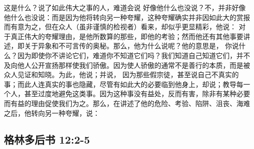 \par

这是什么？说了如此伟大之事的人，难道会说 好像他什么也没说？不，并非好像他什么也没说：而是因为他将转向另一种夸耀，这种夸耀确实并非因如此大的赏报而有意为之，但在众人（虽非谨慎的检视者）看来，却似乎更显精彩，他说： 对于真正伟大的夸耀理由，是他所数算的那些，即他的考验；然而他还有其他事要讲述，即关于异象和不可言传的奥秘。那么，他为什么说呢？他的意思是， 你说什么？因为即使你不讲论它们，难道你不知道它们吗？我们知道自己知道它们，并不及向他人公开宣扬那样使我们骄傲。因为使人骄傲的通常不是善行的本质，而是被众人见证和知晓。为此，他说；并说， 因为那些假宗徒，甚至说自己不真实的事；而此人连真实的事也隐藏，尽管有如此大的必要临到他身上，却说；教导每一个人，甚至过度地避免这类事。因为这种事没有益处，反而有害，除非有某种必要而有益的理由促使我们为之。那么，在讲述了他的危险、考验、陷阱、沮丧、海难之后，他转向另一种夸耀，说：\par


\subsection{格林多后书 12:2-5}

\par

